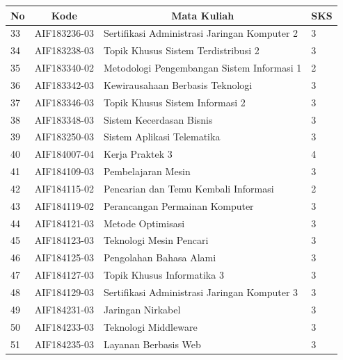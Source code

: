 \begin{table}[H]
	\centering
		\begin{tabular}{|p{0.5cm}|p{2.85cm}|p{4.95cm}|p{2.7cm}|}
			\hline
			\multicolumn{1}{|c|}{\textbf{No}} & \multicolumn{1}{c|}{\textbf{Kode}} & \multicolumn{1}{c|}{\textbf{Mata Kuliah}} & \multicolumn{1}{c|}{\textbf{SKS}} \\ \hline
33 & AIF183236-03 & Sertifikasi Administrasi Jaringan Komputer 2 & 3 \\ \hline
34 & AIF183238-03 & Topik Khusus Sistem Terdistribusi 2          & 3 \\ \hline
35 & AIF183340-02 & Metodologi Pengembangan Sistem Informasi 1   & 2 \\ \hline
36 & AIF183342-03 & Kewirausahaan Berbasis Teknologi             & 3 \\ \hline
37 & AIF183346-03 & Topik Khusus Sistem Informasi 2              & 3 \\ \hline
38 & AIF183348-03 & Sistem Kecerdasan Bisnis                     & 3 \\ \hline
39 & AIF183250-03 & Sistem Aplikasi Telematika                   & 3 \\ \hline
40 & AIF184007-04 & Kerja Praktek 3                              & 4 \\ \hline
41 & AIF184109-03 & Pembelajaran Mesin                           & 3 \\ \hline
42 & AIF184115-02 & Pencarian dan Temu Kembali Informasi         & 2 \\ \hline
43 & AIF184119-02 & Perancangan Permainan Komputer               & 3 \\ \hline
44 & AIF184121-03 & Metode Optimisasi                            & 3 \\ \hline
45 & AIF184123-03 & Teknologi Mesin Pencari                      & 3 \\ \hline
46 & AIF184125-03 & Pengolahan Bahasa Alami                      & 3 \\ \hline
47 & AIF184127-03 & Topik Khusus Informatika 3                   & 3 \\ \hline
48 & AIF184129-03 & Sertifikasi Administrasi Jaringan Komputer 3 & 3 \\ \hline
49 & AIF184231-03 & Jaringan Nirkabel                            & 3 \\ \hline
50 & AIF184233-03 & Teknologi Middleware                         & 3 \\ \hline
51 & AIF184235-03 & Layanan Berbasis Web                         & 3 \\ \hline

\end{tabular}
\end{table}
